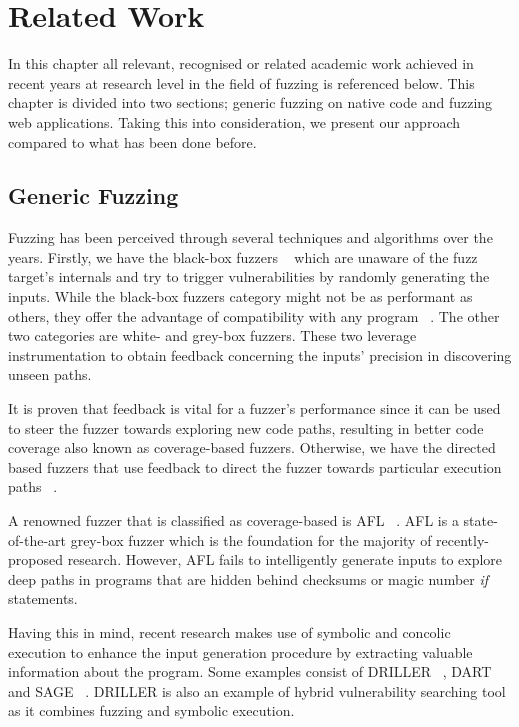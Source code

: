 \chapter{Related Work}
\label{sec:relatedwork}
\minitoc
\vspace*{1cm}

In this chapter all relevant, recognised or related academic work achieved in recent years at research level in the field of fuzzing is referenced below. This chapter is divided into two sections; generic fuzzing on native code and fuzzing web applications. Taking this into consideration, we present our approach compared to what has been done before.

\section{Generic Fuzzing}
Fuzzing has been perceived through several techniques and algorithms over the years. Firstly, we have the black-box fuzzers ~\cite{householder2012probability,sparks2007automated,woo2013scheduling} which are unaware of the fuzz target's internals and try to trigger vulnerabilities by randomly generating the inputs. While the black-box fuzzers category might not be as performant as others, they offer
the advantage of compatibility with any program ~\cite{osterlund2020parmesan,rawat2017vuzzer}. The other two categories are white- and grey-box fuzzers. These two leverage instrumentation to obtain feedback concerning the inputs' precision in discovering unseen paths. 

It is proven that feedback is vital for a fuzzer's performance since it can be used to steer the fuzzer towards exploring new code paths, resulting in better code coverage also known as
coverage-based fuzzers. Otherwise, we have the directed based fuzzers that use feedback to direct the fuzzer towards particular execution paths ~\cite{godefroid2005dart}.

A renowned fuzzer that is classified as coverage-based is AFL ~\cite{zalewski2015american}. AFL is a state-of-the-art grey-box fuzzer which is the foundation for the majority of recently-proposed research. However, AFL fails to intelligently generate inputs to explore deep paths in programs that are hidden behind checksums or magic number \emph{if} statements.

Having this in mind, recent research makes use of symbolic and concolic execution to enhance the input generation procedure by extracting valuable information about the program. Some examples consist of DRILLER ~\cite{stephens2016driller}, DART ~\cite{godefroid2005dart} and SAGE ~\cite{godefroid2012sage}. DRILLER is also an example of hybrid vulnerability searching tool as it combines fuzzing and symbolic execution.

